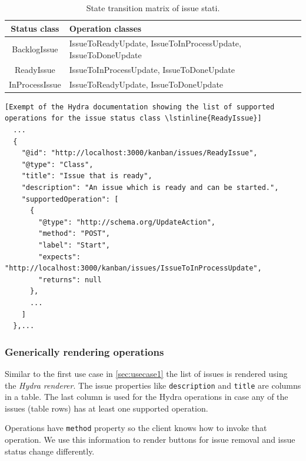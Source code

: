 \begin{table}
  \begin{center}
    \begin{tabular}{ |c|l| }
      \hline
      Status class & Operation classes \\
      \hline
      BacklogIssue & IssueToReadyUpdate, IssueToInProcessUpdate, IssueToDoneUpdate \\
      ReadyIssue & IssueToInProcessUpdate, IssueToDoneUpdate \\
      InProcessIssue & IssueToReadyUpdate, IssueToDoneUpdate \\
      \hline
    \end{tabular}
    \caption{State transition matrix of issue stati.}
    \label{statetransitionmatrix}
  \end{center}
\end{table}

\lstset{language=JSON}
\begin{lstlisting}[Exempt of the Hydra documentation showing the list of supported operations for the issue status class \lstinline{ReadyIssue}]
  ...
  {
    "@id": "http://localhost:3000/kanban/issues/ReadyIssue",
    "@type": "Class",
    "title": "Issue that is ready",
    "description": "An issue which is ready and can be started.",
    "supportedOperation": [
      {
        "@type": "http://schema.org/UpdateAction",
        "method": "POST",
        "label": "Start",
        "expects": "http://localhost:3000/kanban/issues/IssueToInProcessUpdate",
        "returns": null
      },
      ...
    ]
  },...
\end{lstlisting}

\subsubsection{Generically rendering operations}

Similar to the first use case in \ref{sec:usecase1} the list of issues is rendered using the \textit{Hydra renderer}. The issue properties like \lstinline{description} and \lstinline{title} are columns in a table. The last column is used for the Hydra operations in case any of the issues (table rows) has at least one supported operation.

Operations have \lstinline{method} property so the client knows how to invoke that operation. We use this information to render buttons for issue removal and issue status change differently.

